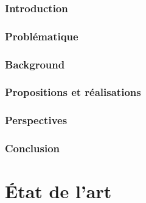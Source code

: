 \documentclass[french, 12pt]{article} %
\begin{document}
	\section{Introduction}
	 
	
	\newpage
	\section{Problématique}
	
	
	\newpage
	\section{Background}
	
	
	
	\newpage
	\section{Propositions et réalisations}
	
	
	
	
	\newpage
	\section{Perspectives}
	
	
	\newpage
	\section{Conclusion}
	
	
	\newpage
	\printglossaries

	\newpage
	

\newpage
	\part{État de l'art} \appendix
	
	
	
	
	

%	
%	
%	

	
\end{document}
